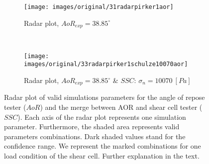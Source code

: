 \begin{figure}[htp] \centering
    \begin{subfigure}[b]{0.96\columnwidth}
        \texttt{[image: images/original/31radarpirker1aor]}
        \caption{Radar plot, $AoR_{exp} = 38.85 ^\circ$}
        \label{fig:31radarpirker1aor} 
    \end{subfigure}\\
        \begin{subfigure}[b]{0.96\columnwidth}
        \texttt{[image: images/original/33radarpirker1schulze10070aor]}
        \caption{Radar plot, $AoR_{exp} = 38.85
        ^\circ$ \& $SSC$: $\sigma_n=10070 ~[Pa]$}
        \label{fig:33radarpirker1schulze10070aor} 
    \end{subfigure}
    \caption[Radar plot of valid simulations parameters for the AOR and
    the merge between AOR and SCT valid parameters]{Radar plot of valid
    simulations parameters for the angle of repose tester ($AoR$) and the merge
    between AOR and shear cell tester ($SSC$).
    Each axis of the radar plot represents one simulation parameter.
    Furthermore, the shaded area represents valid parameters combinations.
    Dark shaded values stand for the confidence range.
    We represent the marked combinations for one load condition of the shear
    cell.
    Further explanation in the text. }
    \label{fig:35schulze10070aorradarandcloud}
\end{figure}